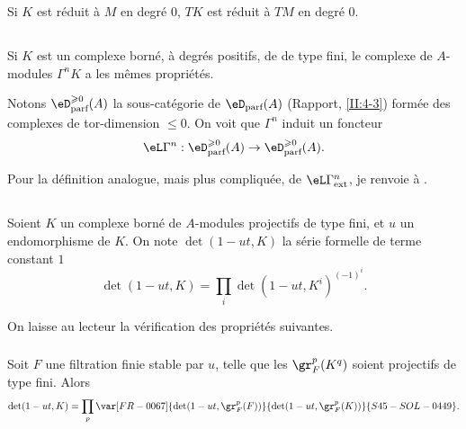 Si $K$ est réduit à $M$ en degré $0$, $T K$ est réduit à $T M$ en 
degré $0$. 





\subsection{}\label{III:1-6}

Si $K$ est un complexe borné, à degrés positifs, de  
de type fini, le complexe de $A$-modules $\Gamma^n K$ a les mêmes 
propriétés. 

Notons $\eD_\text{parf}^{\geqslant 0}(A)$ la sous-catégorie de 
$\eD_\text{parf}(A)$ (Rapport, \ref{II:4-3}) formée des complexes de 
tor-dimension $\leqslant 0$. On voit que $\Gamma^n$ induit un foncteur 
\[
  \eL\Gamma^n : \eD_\text{parf}^{\geqslant 0}(A) \to \eD_\text{parf}^{\geqslant 0}(A) \text{.}
\]

Pour la définition analogue, mais plus compliquée, de 
$\eL\Gamma_\text{ext}^n$, je renvoie à . 





\subsection{}\label{III:1-7}

Soient $K$ un complexe borné de $A$-modules projectifs de type fini, et $u$ 
un endomorphisme de $K$. On note $\det(1-u t,K)$ la série formelle de terme 
constant $1$ 
\[
  \det(1-u t,K) = \prod_i \det(1-u t,K^i)^{(-1)^i} \text{.}
\]

On laisse au lecteur la vérification des propriétés suivantes. 


\subsubsection{}\label{III:1-7-1}

Soit $F$ une filtration finie stable par $u$, telle que les $\gr_F^p(K^q)$ 
soient projectifs de type fini. Alors 
\[
  \det(1-u t,K) = \prod_p \var[FR-0067]{\det(1-u t,\gr_F^p(F))}{\det(1-u t,\gr_F^p(K))}{S45-SOL-0449} \text{.}
\]


\subsubsection{}\label{III:1-7-2}

